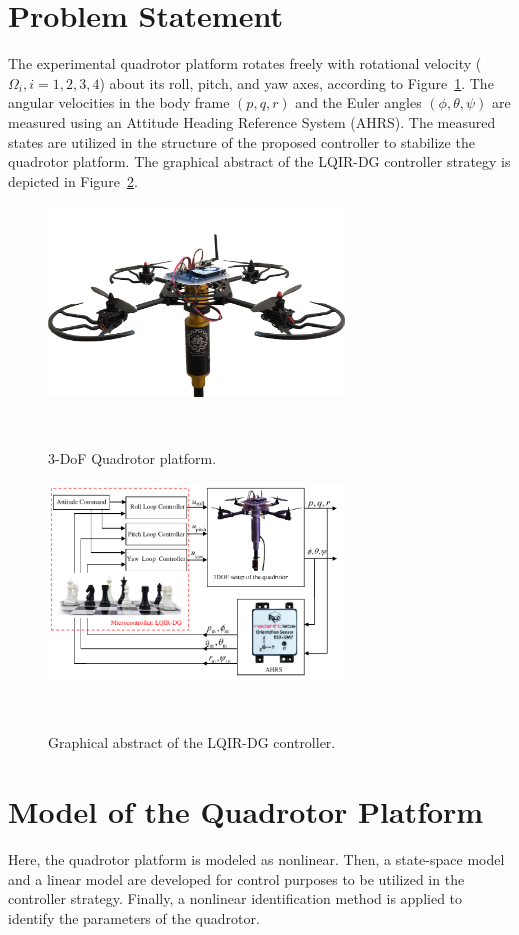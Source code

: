 \documentclass[3p]{elsarticle}
\begin{document}
\section{Problem Statement}\label{sec:problem}
\noindent The experimental quadrotor platform rotates freely with rotational velocity ($\Omega_i, i = 1, 2, 3, 4$) about its roll, pitch, and yaw axes, according to Figure~\ref{fig:quadrotor}.
The angular velocities in the body frame $(p, q, r)$ and the Euler angles $(\phi, \theta, \psi)$ are measured using an Attitude Heading Reference System (AHRS).
The measured states are utilized in the structure of the proposed controller to stabilize the quadrotor platform.
The graphical abstract of the LQIR-DG controller strategy is depicted in Figure~\ref{fig:blockdiagram}.
\begin{figure}[H]
    \centering
    \includegraphics[width=0.7\textwidth]{../Figure/3DOFQuad.png}
    \caption{3-DoF Quadrotor platform.}
~\label{fig:quadrotor}
 \end{figure}
 
 \begin{figure}[H]
    \centering
    \includegraphics[width=0.7\textwidth]{../Figure/schematic.pdf}
    \caption{Graphical abstract of the LQIR-DG controller.}
~\label{fig:blockdiagram}
 \end{figure}
 \section{Model of the Quadrotor Platform}\label{sec:modeling}
 \noindent Here, the quadrotor platform is modeled as nonlinear.
 Then, a state-space model and a linear model are developed for control purposes to be utilized in the controller strategy.
 Finally, a nonlinear identification method is applied to identify the parameters of the quadrotor.
\end{document}
